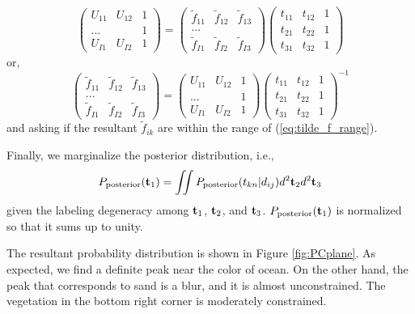 \documentclass[iop,numberedappendix,apj]{emulateapj}
\def\fast{\tilde f}
\begin{document}
\begin{equation}
\begin{pmatrix}
U_{11} & U_{12} & 1 \\
... & & 1 \\
U_{I1} & U_{I2} & 1 
\end{pmatrix}
= 
\begin{pmatrix}
\fast_{11} & \fast_{12} & \fast_{13}  \\
... & \\
\fast_{I1} & \fast_{I2} & \fast_{I3}
\end{pmatrix}
\begin{pmatrix}
t_{11} & t_{12} & 1 \\
t_{21} & t_{22} & 1 \\
t_{31} & t_{32} & 1 
\end{pmatrix}
\end{equation}
or,
\begin{equation}
\begin{pmatrix}
\fast_{11} & \fast_{12} & \fast_{13}  \\
... & \\
\fast_{I1} & \fast_{I2} & \fast_{I3}
\end{pmatrix}
=
\begin{pmatrix}
U_{11} & U_{12} & 1 \\
... & & 1 \\
U_{I1} & U_{I2} & 1 
\end{pmatrix}
\begin{pmatrix}
t_{11} & t_{12} & 1 \\
t_{21} & t_{22} & 1 \\
t_{31} & t_{32} & 1 
\end{pmatrix}^{-1} 
\label{eq:f=ds-1}
\end{equation}
and asking if the resultant $\fast_{ik}$ are within the range of (\ref{eq:tilde_f_range}). 

Finally, we marginalize the posterior distribution, i.e.,
\begin{equation} 
P_{\rm posterior} ( {\bf t}_1) = \iint P_{\rm posterior} ( t_{kn} | d_{ij} ) d^2 {\bf t}_2 d^2 {\bf t}_3
\end{equation}
given the labeling degeneracy among ${\bf t}_1$, ${\bf t}_2$, and ${\bf t}_3$. 
$P_{\rm posterior} ( {\bf t}_1) $ is normalized so that it sums up to unity. 

The resultant probability distribution is shown in Figure \ref{fig:PCplane}. 
As expected, we find a definite peak near the color of ocean. 
On the other hand, the peak that corresponds to sand is a blur, and it is almost unconstrained. 
The vegetation in the bottom right corner is moderately constrained. 
\end{document}
